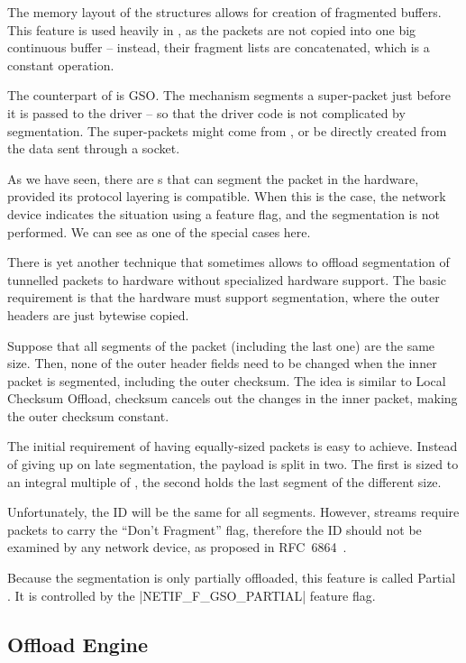 The memory layout of the \skb{} structures allows for creation of fragmented
buffers. This feature is used heavily in , as the packets are not copied
into one big continuous buffer -- instead, their fragment lists are
concatenated, which is a constant operation.

The counterpart of  is \acrfull{GSO}. The  mechanism segments
a super-packet just before it is passed to the driver -- so that the driver
code is not complicated by segmentation. The super-packets might come from
, or be directly created from the data sent through a socket.

As we have seen, there are s that can segment the packet in the
hardware, provided its protocol layering is compatible. When this is the
case, the network device indicates the situation using a feature flag, and the
segmentation is not performed. We can see  as one of the special cases
here.

There is yet another technique that sometimes allows to offload segmentation
of tunnelled packets to hardware without specialized hardware support. The basic
requirement is that the hardware must support segmentation, where the outer
headers are just bytewise copied.

Suppose that all segments of the packet (including the last one) are the same size. Then,
none of the outer header fields need to be changed when the inner packet is
segmented, including the outer checksum. The idea is similar to Local Checksum
Offload, checksum cancels out the changes in the inner packet, making the outer
checksum constant.

The initial requirement of having equally-sized packets is easy to achieve.
Instead of giving up on late segmentation, the payload is split in two. The
first is sized to an integral multiple of , the second holds the last
segment of the different size.

Unfortunately, the  ID will be the same for all segments.
However,  streams require  packets to carry the ``Don't
Fragment'' flag, therefore the ID should not be examined by any network device,
as proposed in RFC~6864~\cite{RFC6864}.

Because the segmentation is only partially offloaded, this feature is called
Partial . It is controlled by the \macro|NETIF_F_GSO_PARTIAL| feature flag.

\subsection{ Offload Engine}

